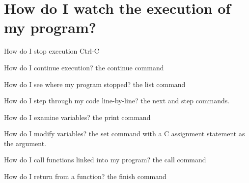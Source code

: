 ﻿\documentclass{beamer}
\begin{document}
\section{How do I watch the execution of my program?}
\begin{frame}
\begin{block}{How do I stop execution}
\alert{Ctrl\textrm{-}C}
\end{block}
\pause

\begin{block}{How do I continue execution?}
the \alert{continue} command 
\end{block}
\pause

\begin{block}{How do I see where my program stopped?}
the \alert{list} command
\end{block}

\end{frame}

\begin{frame}
\begin{block}{How do I step through my code line-by-line?}
 the \alert{next} and \alert{step} commands. 
\end{block}
\pause

\begin{block}{How do I examine variables?}
the \alert{print} command 
\end{block}
\pause

\begin{block}{How do I modify variables?}
the \alert{set} command with a C assignment statement as the argument.
\end{block}

\end{frame}

\begin{frame}
\begin{block}{How do I call functions linked into my program?}
the \alert{call} command
\end{block}
\pause

\begin{block}{How do I return from a function?}
the \alert{finish} command
\end{block}
\end{frame}
\end{document}
